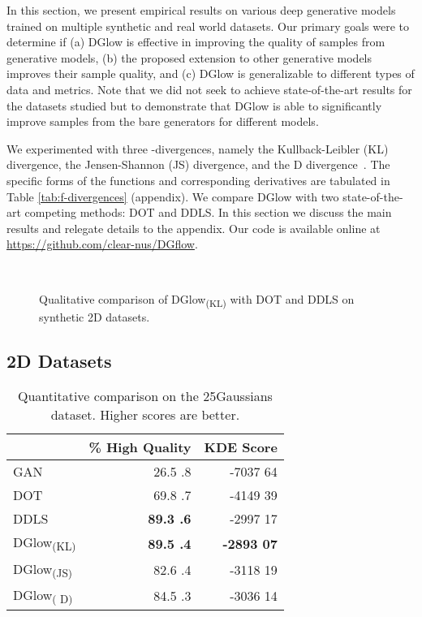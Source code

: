 \documentclass{article} \usepackage{iclr2021_conference,times}
\newcommand{\ourmethod}{\textsc{DG}low}
\begin{document}
In this section, we present empirical results on various deep generative models trained on multiple synthetic and real world datasets. Our primary goals were to determine if (a) \ourmethod{} is effective in improving the quality of samples from generative models, (b) the proposed extension to other generative models improves their sample quality, and (c) \ourmethod{} is generalizable to different types of data and metrics. Note that we did not seek to achieve state-of-the-art results for the datasets studied but to demonstrate that \ourmethod{} is able to significantly improve samples from the bare generators for different models.

We experimented with three -divergences, namely the Kullback-Leibler (KL) divergence, the Jensen-Shannon (JS) divergence, and the  D divergence~\citep{gao2019deep}. The specific forms of the functions  and corresponding derivatives are tabulated in Table \ref{tab:f-divergences} (appendix). We compare \ourmethod{} with two state-of-the-art competing methods: DOT and DDLS. In this section we discuss the main results and relegate details to the appendix. Our code is available  online  at \url{https://github.com/clear-nus/DGflow}. 

\begin{figure}[!htb]
	\centering
	\\
	\caption{\small{Qualitative comparison of \ourmethod{}\textsubscript{(KL)} with DOT and DDLS on synthetic 2D datasets.}}
	\label{fig:2ddatasets}
	\vspace{-1em}
\end{figure}

\subsection{2D Datasets}

\begin{wraptable}{R}{.5\textwidth}
	\vspace{-.8em}
	\scriptsize
	\caption{\small{Quantitative comparison on the 25Gaussians dataset. Higher scores are better.}}
	\label{tab:2ddatasets}
	\centering
	\begin{tabular}{lrr}
	\toprule
	& \% High Quality & KDE Score\\
	\midrule
	GAN & 26.5  .8  & -7037  64\\
	DOT & 69.8  .7 & -4149  39\\
	DDLS & \textbf{89.3  .6} & -2997  17\\
	\midrule
	DGlow\textsubscript{(KL)} & \textbf{89.5  .4} & \textbf{-2893  07}\\
	DGlow\textsubscript{(JS)} & 82.6  .4 & -3118  19\\
	DGlow\textsubscript{( D)} & 84.5  .3 & -3036  14\\
	\bottomrule
	\end{tabular}
\end{wraptable}
\end{document}
